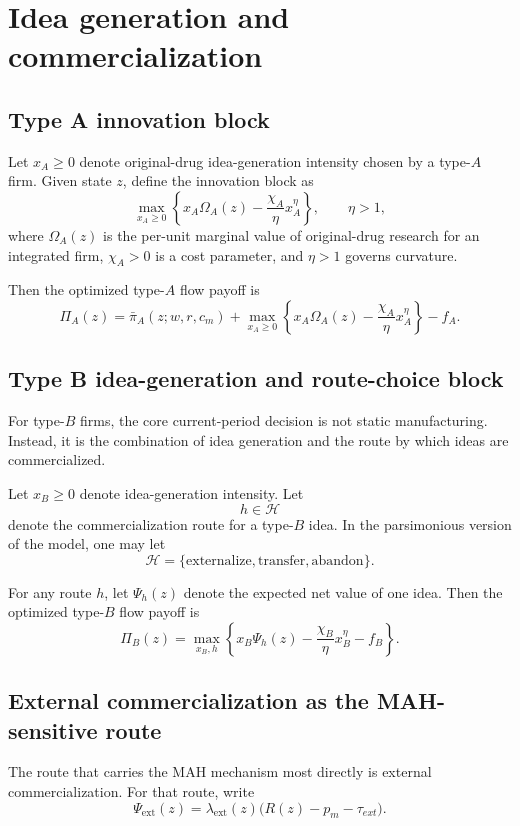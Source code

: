 \documentclass[12pt]{article}
\begin{document}
\section{Idea generation and commercialization}

\subsection{Type A innovation block}

Let $x_A\ge 0$ denote original-drug idea-generation intensity chosen by a type-$A$ firm.
Given state $z$, define the innovation block as
\[
\max_{x_A\ge 0}
\left\{
x_A\Omega_A(z)-\frac{\chi_A}{\eta}x_A^\eta
\right\},
\qquad \eta>1,
\]
where $\Omega_A(z)$ is the per-unit marginal value of original-drug research for
an integrated firm, $\chi_A>0$ is a cost parameter, and $\eta>1$ governs curvature.

Then the optimized type-$A$ flow payoff is
\[
\Pi_A(z)
=
\bar{\pi}_A(z;w,r,c_m)
+
\max_{x_A\ge 0}
\left\{
x_A\Omega_A(z)-\frac{\chi_A}{\eta}x_A^\eta
\right\}
-f_A.
\]

\subsection{Type B idea-generation and route-choice block}

For type-$B$ firms, the core current-period decision is not static manufacturing.
Instead, it is the combination of idea generation and the route by which ideas
are commercialized.

Let $x_B\ge 0$ denote idea-generation intensity. Let
\[
h\in\mathcal{H}
\]
denote the commercialization route for a type-$B$ idea. In the parsimonious
version of the model, one may let
\[
\mathcal{H}=\{\text{externalize},\text{transfer},\text{abandon}\}.
\]

For any route $h$, let $\Psi_h(z)$ denote the expected net value of one idea.
Then the optimized type-$B$ flow payoff is
\[
\Pi_B(z)
=
\max_{x_B,h}
\left\{
x_B\Psi_h(z)-\frac{\chi_B}{\eta}x_B^\eta-f_B
\right\}.
\]

\subsection{External commercialization as the MAH-sensitive route}

The route that carries the MAH mechanism most directly is external commercialization.
For that route, write
\[
\Psi_{\mathrm{ext}}(z)
=
\lambda_{\mathrm{ext}}(z)\bigl(R(z)-p_m-\tau_{ext}\bigr).
\]
\end{document}

